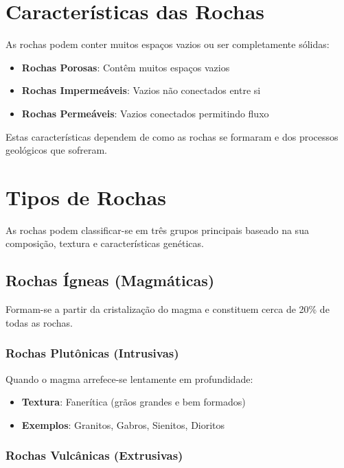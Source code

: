 \documentclass[12pt,a4paper,twoside]{book}
\begin{document}
\section{Características das Rochas}

As rochas podem conter muitos espaços vazios ou ser completamente sólidas:
\begin{itemize}
    \item \textbf{Rochas Porosas}: Contêm muitos espaços vazios
    \item \textbf{Rochas Impermeáveis}: Vazios não conectados entre si
    \item \textbf{Rochas Permeáveis}: Vazios conectados permitindo fluxo
\end{itemize}

Estas características dependem de como as rochas se formaram e dos processos geológicos que sofreram.

\section{Tipos de Rochas}

As rochas podem classificar-se em três grupos principais baseado na sua composição, textura e 
características genéticas.

\subsection{Rochas Ígneas (Magmáticas)}

Formam-se a partir da cristalização do magma e constituem cerca de 20\% de todas as rochas.

\subsubsection{Rochas Plutônicas (Intrusivas)}

Quando o magma arrefece-se lentamente em profundidade:
\begin{itemize}
    \item \textbf{Textura}: Fanerítica (grãos grandes e bem formados)
    \item \textbf{Exemplos}: Granitos, Gabros, Sienitos, Dioritos
\end{itemize}

\subsubsection{Rochas Vulcânicas (Extrusivas)}
\end{document}
